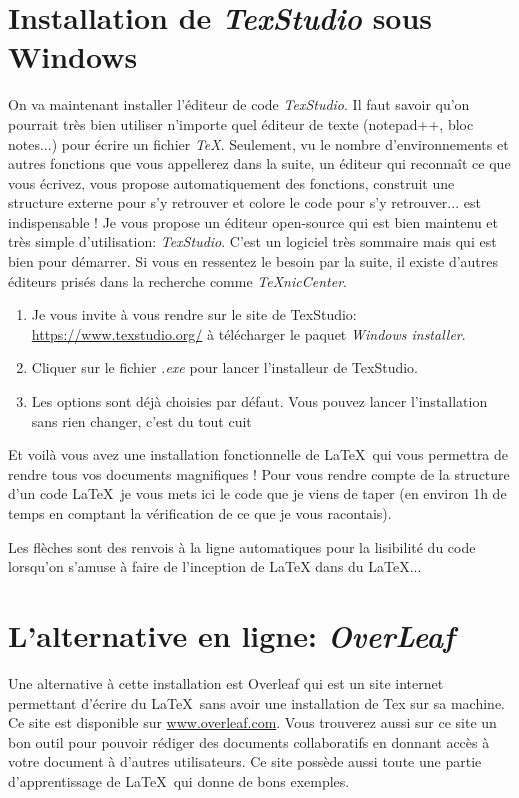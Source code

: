 \documentclass[11pt,a4paper]{article} %
\begin{document}
\section{Installation de \textit{TexStudio} sous Windows}
On va maintenant installer l'éditeur de code \textit{TexStudio}. Il faut savoir qu'on pourrait très bien utiliser n'importe quel éditeur de texte (notepad++, bloc notes...) pour écrire un fichier \textit{TeX}. Seulement, vu le nombre d'environnements et autres fonctions que vous appellerez dans la suite, un éditeur qui reconnaît ce que vous écrivez, vous propose automatiquement des fonctions, construit une structure externe pour s'y retrouver et colore le code pour s'y retrouver... est indispensable ! Je vous propose un éditeur open-source qui est bien maintenu et très simple d'utilisation: \textit{TexStudio}. C'est un logiciel très sommaire mais qui est bien pour démarrer. Si vous en ressentez le besoin par la suite, il existe d'autres éditeurs prisés dans la recherche comme \textit{TeXnicCenter}.

\begin{enumerate}
	\item Je vous invite à vous rendre sur le site de TexStudio: \url{https://www.texstudio.org/} à télécharger le paquet \textit{Windows installer}.
	\item Cliquer sur le fichier \textit{.exe} pour lancer l'installeur de TexStudio.
	\item Les options sont déjà choisies par défaut. Vous pouvez lancer l'installation sans rien changer, c'est du tout cuit \smiley{}
\end{enumerate}

Et voilà vous avez une installation fonctionnelle de \LaTeX\ qui vous permettra de rendre tous vos documents magnifiques ! Pour vous rendre compte de la structure d'un code \LaTeX\ je vous mets ici le code que je viens de taper (en environ 1h de temps en comptant la vérification de ce que je vous racontais).

Les flèches sont des renvois à la ligne automatiques pour la lisibilité du code lorsqu'on s'amuse à faire de l'inception de LaTeX dans du LaTeX...

\section{L'alternative en ligne: \textit{OverLeaf}}
Une alternative à cette installation est Overleaf qui est un site internet permettant d'écrire du \LaTeX\ sans avoir une installation de Tex sur sa machine. Ce site est disponible sur \url{www.overleaf.com}. Vous trouverez aussi sur ce site un bon outil pour pouvoir rédiger des documents collaboratifs en donnant accès à votre document à d'autres utilisateurs. Ce site possède aussi toute une partie d'apprentissage de \LaTeX\ qui donne de bons exemples.
\newline
\end{document}
